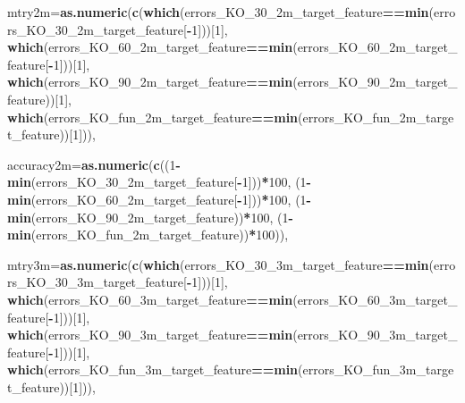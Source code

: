 \documentclass[]{article}
\newenvironment{Shaded}{\begin{snugshade}}{\end{snugshade}}
\newcommand{\KeywordTok}[1]{\textcolor[rgb]{0.13,0.29,0.53}{\textbf{#1}}}
\newcommand{\DataTypeTok}[1]{\textcolor[rgb]{0.13,0.29,0.53}{#1}}
\newcommand{\DecValTok}[1]{\textcolor[rgb]{0.00,0.00,0.81}{#1}}
\newcommand{\OperatorTok}[1]{\textcolor[rgb]{0.81,0.36,0.00}{\textbf{#1}}}
\newcommand{\NormalTok}[1]{#1}
\begin{document}
\begin{Shaded}
\begin{Highlighting}[]
              
              \DataTypeTok{mtry2m=}\KeywordTok{as.numeric}\NormalTok{(}\KeywordTok{c}\NormalTok{(}\KeywordTok{which}\NormalTok{(errors_KO_30_2m_target_feature}\OperatorTok{==}\KeywordTok{min}\NormalTok{(errors_KO_30_2m_target_feature[}\OperatorTok{-}\DecValTok{1}\NormalTok{]))[}\DecValTok{1}\NormalTok{],}
                                    \KeywordTok{which}\NormalTok{(errors_KO_60_2m_target_feature}\OperatorTok{==}\KeywordTok{min}\NormalTok{(errors_KO_60_2m_target_feature[}\OperatorTok{-}\DecValTok{1}\NormalTok{]))[}\DecValTok{1}\NormalTok{],}
                                   \KeywordTok{which}\NormalTok{(errors_KO_90_2m_target_feature}\OperatorTok{==}\KeywordTok{min}\NormalTok{(errors_KO_90_2m_target_feature))[}\DecValTok{1}\NormalTok{],}
                                   \KeywordTok{which}\NormalTok{(errors_KO_fun_2m_target_feature}\OperatorTok{==}\KeywordTok{min}\NormalTok{(errors_KO_fun_2m_target_feature))[}\DecValTok{1}\NormalTok{])),}
              
                 \DataTypeTok{accuracy2m=}\KeywordTok{as.numeric}\NormalTok{(}\KeywordTok{c}\NormalTok{((}\DecValTok{1}\OperatorTok{-}\KeywordTok{min}\NormalTok{(errors_KO_30_2m_target_feature[}\OperatorTok{-}\DecValTok{1}\NormalTok{]))}\OperatorTok{*}\DecValTok{100}\NormalTok{,}
\NormalTok{                                    (}\DecValTok{1}\OperatorTok{-}\KeywordTok{min}\NormalTok{(errors_KO_60_2m_target_feature[}\OperatorTok{-}\DecValTok{1}\NormalTok{]))}\OperatorTok{*}\DecValTok{100}\NormalTok{,}
\NormalTok{                                    (}\DecValTok{1}\OperatorTok{-}\KeywordTok{min}\NormalTok{(errors_KO_90_2m_target_feature))}\OperatorTok{*}\DecValTok{100}\NormalTok{,}
\NormalTok{                                    (}\DecValTok{1}\OperatorTok{-}\KeywordTok{min}\NormalTok{(errors_KO_fun_2m_target_feature))}\OperatorTok{*}\DecValTok{100}\NormalTok{)),}
              
              
              \DataTypeTok{mtry3m=}\KeywordTok{as.numeric}\NormalTok{(}\KeywordTok{c}\NormalTok{(}\KeywordTok{which}\NormalTok{(errors_KO_30_3m_target_feature}\OperatorTok{==}\KeywordTok{min}\NormalTok{(errors_KO_30_3m_target_feature[}\OperatorTok{-}\DecValTok{1}\NormalTok{]))[}\DecValTok{1}\NormalTok{],}
                                    \KeywordTok{which}\NormalTok{(errors_KO_60_3m_target_feature}\OperatorTok{==}\KeywordTok{min}\NormalTok{(errors_KO_60_3m_target_feature[}\OperatorTok{-}\DecValTok{1}\NormalTok{]))[}\DecValTok{1}\NormalTok{],}
                                   \KeywordTok{which}\NormalTok{(errors_KO_90_3m_target_feature}\OperatorTok{==}\KeywordTok{min}\NormalTok{(errors_KO_90_3m_target_feature[}\OperatorTok{-}\DecValTok{1}\NormalTok{]))[}\DecValTok{1}\NormalTok{],}
                                   \KeywordTok{which}\NormalTok{(errors_KO_fun_3m_target_feature}\OperatorTok{==}\KeywordTok{min}\NormalTok{(errors_KO_fun_3m_target_feature))[}\DecValTok{1}\NormalTok{])),}
              

\end{Highlighting}
\end{Shaded}
\end{document}
